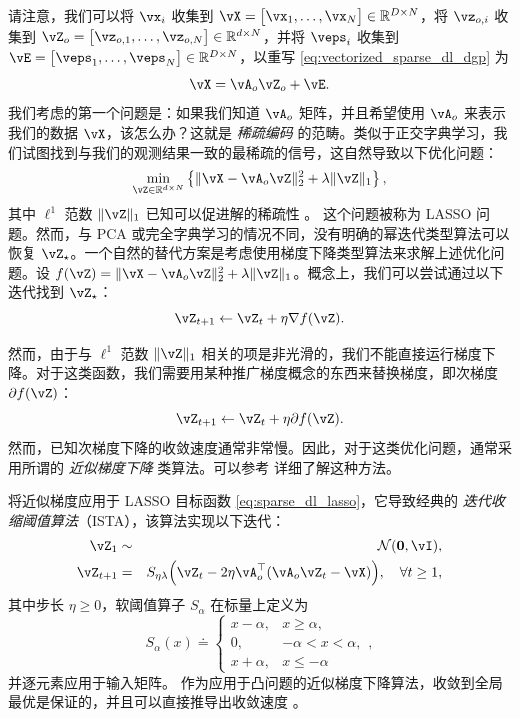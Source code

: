 \documentclass[../../book-main.tex]{subfiles}
\begin{document}
请注意，我们可以将 \(\vx_{i}\) 收集到 \(\vX = \mat{\vx_{1}, \dots, \vx_{N}} \in \R^{D \times N}\)，将 \(\vz_{o, i}\) 收集到 \(\vZ_{o} = \mat{\vz_{o, 1}, \dots, \vz_{o, N}} \in \R^{d  \times N}\)，并将 \(\veps_{i}\) 收集到 \(\vE = \mat{\veps_{1}, \dots, \veps_{N}} \in \R^{D \times N}\)，以重写 \eqref{eq:vectorized_sparse_dl_dgp} 为
\begin{equation}\label{eq:sparse_dl_dgp}
    \vX = \vA_{o}\vZ_{o} + \vE.
\end{equation}
我们考虑的第一个问题是：如果我们知道 \(\vA_{o}\) 矩阵，并且希望使用 \(\vA_{o}\) 来表示我们的数据 \(\vX\)，该怎么办？这就是 \textit{稀疏编码} 的范畴。类似于正交字典学习，我们试图找到与我们的观测结果一致的最稀疏的信号，这自然导致以下优化问题：
\begin{equation}\label{eq:sparse_dl_lasso}
    \min_{\vZ \in \R^{d \times N}}\bc{\norm{\vX - \vA_{o}\vZ}_{2}^{2} + \lambda \norm{\vZ}_{1}},
\end{equation}
其中 \(\ell^1\) 范数 \(\norm{\vZ}_{1}\) 已知可以促进解的稀疏性 \cite{Wright-Ma-2022}。
这个问题被称为 LASSO 问题。然而，与 PCA 或完全字典学习的情况不同，没有明确的幂迭代类型算法可以恢复 \(\vZ_{\star}\)。一个自然的替代方案是考虑使用梯度下降类型算法来求解上述优化问题。设 \(f(\vZ) = \norm{\vX - \vA_{o}\vZ}_{2}^{2} + \lambda \norm{\vZ}_{1}\)。概念上，我们可以尝试通过以下迭代找到 \(\vZ_{\star}\)：
\begin{equation}
    \vZ_{t+1} \leftarrow \vZ_t + \eta \nabla f(\vZ).
\end{equation}

然而，由于与 \(\ell^1\) 范数 \(\norm{\vZ}_{1}\) 相关的项是非光滑的，我们不能直接运行梯度下降。对于这类函数，我们需要用某种推广梯度概念的东西来替换梯度，即次梯度 \(\partial f(\vZ)\)：
\begin{equation}
    \vZ_{t+1} \leftarrow \vZ_t + \eta \partial f(\vZ).
\end{equation}
然而，已知次梯度下降的收敛速度通常非常慢。因此，对于这类优化问题，通常采用所谓的 {\em 近似梯度下降} 类算法。可以参考 \cite{Wright-Ma-2022} 详细了解这种方法。

将近似梯度应用于 LASSO 目标函数 \eqref{eq:sparse_dl_lasso}，它导致经典的 \textit{迭代收缩阈值算法}（ISTA），该算法实现以下迭代：
\begin{eqnarray}
    \vZ_{1} &\sim& \dNorm(\vzero, \vI), \\
    \vZ_{t + 1} &=& S_{\eta\lambda}\rp{\vZ_{t} - 2\eta \vA_{o}^{\top}(\vA_{o}\vZ_{t} - \vX)}, \quad \forall t \geq 1,\label{eq:ista_update}
\end{eqnarray}
其中步长 \(\eta \geq 0\)，软阈值算子 \(S_{\alpha}\) 在标量上定义为
\begin{equation}
    S_{\alpha}(x) \doteq \begin{cases}x - \alpha, & x \geq \alpha, \\ 0, & -\alpha < x < \alpha, \\ x + \alpha, & x \leq -\alpha\end{cases},
\end{equation}
并逐元素应用于输入矩阵。 作为应用于凸问题的近似梯度下降算法，收敛到全局最优是保证的，并且可以直接推导出收敛速度 \cite{Wright-Ma-2022}。
\end{document}
